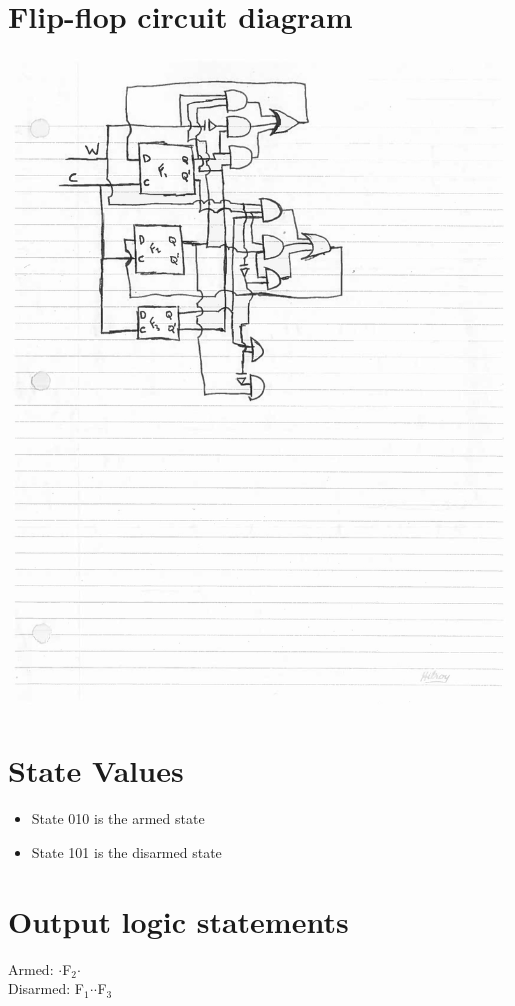 \documentclass[11pt]{article}
\begin{document}
\section{Flip-flop circuit diagram}
\label{sec-7}
\includegraphics[width=\textwidth]{CD1-1.jpg}

\section{State Values}
\label{sec-8}
\begin{itemize}
\item State 010 is the armed state
\item State 101 is the disarmed state
\end{itemize}

\section{Output logic statements}
\label{sec-9}
Armed: $\cdot$F$_{\text{2}}$$\cdot$\\
Disarmed: F$_{\text{1}}$$\cdot$$\cdot$F$_{\text{3}}$
\end{document}
